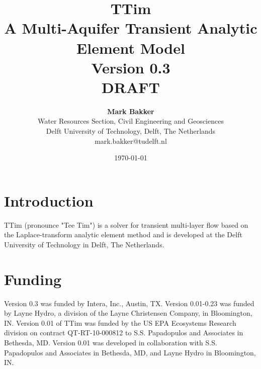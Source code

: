 \documentclass [10pt,letterpaper] {article}
\begin{document}

\title{TTim\\A Multi-Aquifer Transient Analytic Element Model\\Version 0.3\\DRAFT}
\author{{\bf Mark Bakker}\\Water Resources Section, Civil Engineering and Geosciences\\
Delft University of Technology, Delft, The Netherlands
\\mark.bakker@tudelft.nl
}
\date{\today}
\maketitle

\newpage

\tableofcontents

\newpage

\section{Introduction}
TTim (pronounce "Tee Tim") is a solver for transient multi-layer flow based on the
Laplace-transform analytic element method and is developed at the Delft University of Technology in Delft, The Netherlands.

\section{Funding}
Version 0.3 was funded by Intera, Inc., Austin, TX.
Version 0.01-0.23 was funded by  Layne
Hydro, a division of the Layne Christensen Company, in
Bloomington, IN. Version 0.01 of TTim was funded by the US EPA
Ecosystems Research division on contract QT-RT-10-000812 to S.S.
Papadopulos and Associates in Bethesda, MD. Version 0.01 was developed  in collaboration
with S.S. Papadopulos and Associates in Bethesda, MD, and Layne Hydro in Bloomington, IN.
\end{document}

